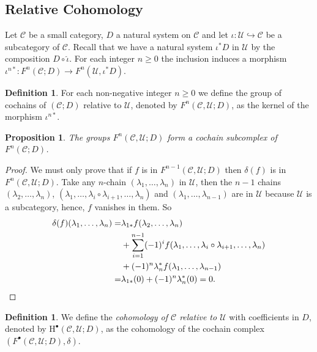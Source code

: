 \documentclass[12pt,reqno]{amsart}
\newtheorem{prop}[teo]{Proposition}
\theoremstyle{definition}
\newtheorem{defi}[teo]{Definition}
\theoremstyle{remark}
\numberwithin{figure}{section}%
\newcommand{\CC}{\mathcal{C}}
\newcommand{\Ho}{\mathrm{H}}
\newcommand{\Uc}{\mathcal{U}}
\begin{document}
\subsection{Relative Cohomology}
Let $\CC$ be a small category, $D$ a natural system on $\CC$ and let $\iota\colon\Uc \hookrightarrow \CC $ be a subcategory of $\CC$. Recall that we have a natural system $\iota^*D$ in $\Uc$ by the composition $D \circ \hat{\iota}$. %
For each integer $n\geq 0$  the inclusion induces a morphism  
$\iota^{n*}\colon F^n(\CC;D) \rightarrow F^n(\Uc,\iota^*D)$.

\begin{defi}
    For each non-negative integer $n\geq 0$ we define the group of cochains of $(\CC;D)$ relative to $\Uc$, denoted by $F^n(\CC, \Uc; D)$, as the kernel of the morphism $\iota^{n*}$. 
\end{defi}

\begin{prop}The groups $F^n(\CC, \Uc; D)$ form a cochain subcomplex of $F^{n}(\CC;D)$. 

\end{prop}
\begin{proof}

We must only prove  that if $f$ is in $F^{n-1}(\CC, \Uc{;} D)$ then $\delta(f)$ is in $F^{n}(\CC, \Uc{;} D)$. Take any $n$-chain $(\lambda_1,\ldots,\lambda_{n})$ in $\Uc$, then the $n-1$ chains $(\lambda_2,\ldots,\lambda_{n})$, $(\lambda_1,\ldots,\lambda_i \circ \lambda_{i+1},\ldots,\lambda_{n})$ and $(\lambda_1,\ldots,\lambda_{n-1})$ are in $\Uc$ because $\Uc$ is a subcategory, hence, $f$ vanishes in them.
 So 
\begin{align*}
\delta(f)(\lambda_1,\ldots,\lambda_{n})=&
\lambda_{1*}f(\lambda_2,\ldots,\lambda_n)\\&+ \sum_{i=1}^{n-1} (-1)^i f(\lambda_1, \dots, \lambda_i \circ \lambda_{i+1}, \ldots, \lambda_{n})\\&+  (-1)^{n}\lambda_n^* f(\lambda_1,\ldots,\lambda_{n-1})\\=&\lambda_{1*}(0)+(-1)^{n}\lambda_{n}^*(0)=0.\qedhere
\end{align*}
\end{proof}

\begin{defi}\label{Relative_Cohomology}
 We define the {\em cohomology of $\CC$ relative to $\Uc$} with coefficients in $D$, denoted by $\Ho^\bullet(\CC, \Uc; D)$, as the cohomology of the cochain complex $(F^\bullet(\CC, \Uc; D),\delta)$.
\end{defi}
\end{document}
